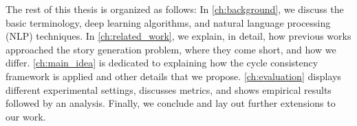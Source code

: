 The rest of this thesis is organized as follows: In \cref{ch:background}, we discuss the basic terminology, deep learning algorithms, and natural language processing (NLP) techniques. In \cref{ch:related_work}, we explain, in detail, how previous works approached the story generation problem, where they come short, and how we differ. \cref{ch:main_idea} is dedicated to explaining how the cycle consistency framework is applied and other details that we propose. \cref{ch:evaluation} displays different experimental settings, discusses metrics, and shows empirical results followed by an analysis. Finally, we conclude and lay out further extensions to our work.

